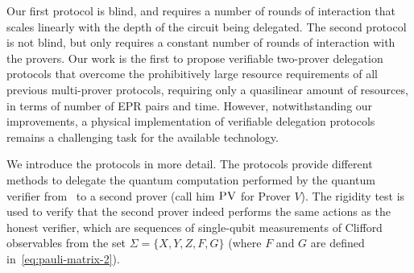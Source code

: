 Our first protocol is blind, and requires a number of rounds of interaction that
scales linearly with the depth of the circuit being delegated. The second
protocol is not blind, but only requires a constant number of rounds of
interaction with the provers. Our work is the first to propose verifiable two-prover delegation protocols that overcome the prohibitively large resource requirements of all previous multi-prover protocols, requiring only a quasilinear amount of resources, in terms of number of EPR pairs and time. However, notwithstanding our improvements, a physical implementation  of verifiable delegation protocols remains a challenging task for the available technology.
 



We introduce the protocols in more detail. The protocols provide different methods to delegate the quantum computation performed by the quantum verifier from~\cite{broadbent15howtoverify} to a second prover (call him $\textsc{PV}$ for Prover $V$). The rigidity test is used to verify that the second prover indeed performs the same actions as the honest verifier, which are sequences of single-qubit measurements of Clifford observables from the set $\Sigma = \{X,Y,Z,F,G\}$ (where $F$ and $G$ are defined in~\eqref{eq:pauli-matrix-2}).

